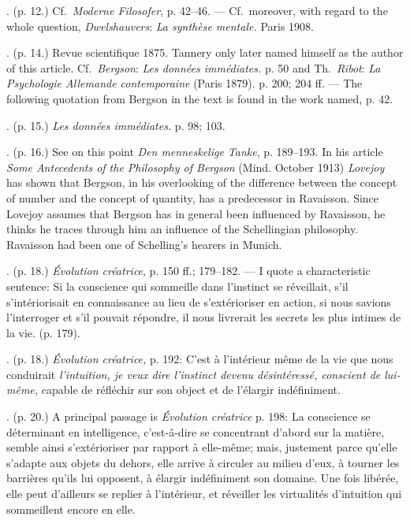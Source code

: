 \documentclass[12pt,a4paper,openany]{book}
\newcommand{\opage}[1]{\marginnote{\footnotesize\textit{[#1]}}}
\newcommand{\notelabel}[1]{\noindent #1}
\begin{document}
\begin{small}
\notelabel{8.} (p. 12.) Cf.\ \textit{Moderne Filosofer}, p. 42--46. --- Cf.\ moreover, with regard to the whole question, \emph{Dwelshauvers}: \textit{La synthèse mentale.} Paris 1908.

\notelabel{9.} (p. 14.) Revue scientifique 1875. Tannery only later named himself as the author of this article. Cf.\ \emph{Bergson}: \textit{Les données immédiates.} p. 50 and Th.\ \emph{Ribot}: \textit{La Psychologie Allemande contemporaine} (Paris 1879). p. 200; 204 ff. --- The following quotation from Bergson in the text is found in the work named, p. 42.

\notelabel{10.} (p. 15.) \textit{Les données immédiates.} p. 98; 103.

\notelabel{11.} (p. 16.) See on this point \textit{Den menneskelige Tanke}, p. 189--193. In his article \textit{Some Antecedents of the Philosophy of Bergson} (Mind. October 1913) \emph{Lovejoy} has shown that Bergson, in his overlooking of the difference between the concept of number and the concept of quantity, has a predecessor in Ravaisson. Since Lovejoy assumes that Bergson has in general been influenced by Ravaisson, he thinks he traces through him an influence of the Schellingian philosophy. Ravaisson had been one of Schelling's hearers in Munich.

\notelabel{12.} (p. 18.) \textit{Évolution créatrice}, p. 150 ff.; 179--182. --- I quote a characteristic sentence: Si la conscience qui sommeille dans l'instinct se réveillait, s'il s'intériorisait en connaissance au lieu de s'extérioriser en action, si nous savions l'interroger et s'il pouvait répondre, il nous livrerait les secrets les plus intimes de la vie. (p. 179).

\notelabel{13.} (p. 18.) \textit{Évolution créatrice,} p. 192: C'est à l'intérieur même de la vie que nous conduirait \textit{l'intuition, je veux dire l'instinct devenu désintéressé, conscient de lui-même,} capable de réfléchir sur son object %
et de l'élargir indéfiniment.

\notelabel{14.} (p. 20.) A principal passage is \textit{Évolution créatrice} p. 198: La conscience se déterminant en intelligence, c'est-â-dire se concentrant d'abord sur la matière, semble ainsi s'extérioriser par rapport à elle-même; mais, justement parce qu'elle s'adapte aux objets du dehors, elle arrive à circuler au milieu d'eux, à tourner les barrières qu'ils lui opposent, à élargir
\opage{67}indéfiniment son domaine. Une fois libérée, elle peut d'ailleurs se replier à l'intérieur, et réveiller les virtualités d'intuition qui sommeillent encore en elle. %


\end{small}
\end{document}
